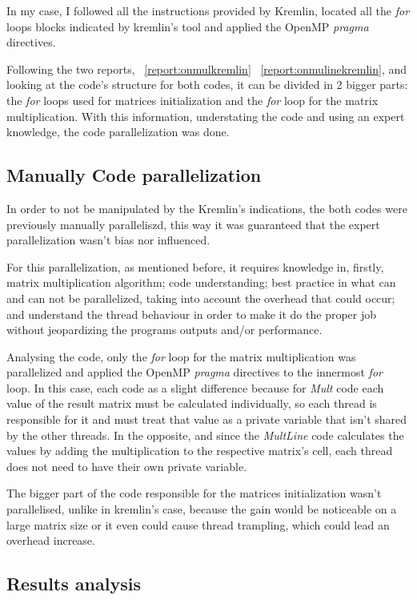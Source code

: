 In my case, I followed all the instructions provided by Kremlin, located all the \textit{for} loops blocks indicated by kremlin's tool and applied the OpenMP \textit{pragma} directives. 

Following the two reports, ~\ref{report:onmulkremlin} ~\ref{report:onmulinekremlin}, and looking at the code's structure for both codes, it can be divided in 2 bigger parts: the \textit{for} loops used for matrices initialization and the \textit{for} loop for the matrix multiplication. With this information, understating the code and using an expert knowledge, the code parallelization was done.


\subsection{Manually Code parallelization}

In order to not be manipulated by the Kremlin's indications, the both codes were previously manually paralleliszd, this way it was guaranteed that the expert parallelization wasn't bias nor influenced.

For this parallelization, as mentioned before, it requires knowledge in, firstly, matrix multiplication algorithm; code understanding; best practice in what can and can not be parallelized, taking into account the overhead that could occur; and understand the thread behaviour in order to make it do the proper job without jeopardizing the programs outputs and/or performance.  

Analysing the code, only the \textit{for} loop for the matrix multiplication was parallelized and applied the OpenMP \textit{pragma} directives to the innermost \textit{for} loop. In this case, each code as a slight difference because for \textit{Mult} code each value of the result matrix must be calculated individually, so each thread is responsible for it and must treat that value as a private variable that isn't shared by the other threads. In the opposite, and since the \textit{MultLine} code calculates the values by adding the multiplication to the respective matrix's cell, each thread does not need to have their own private variable.

The bigger part of the code responsible for the matrices initialization wasn't parallelised, unlike in kremlin's case, because the gain would be noticeable on a large matrix size or it even could cause thread trampling, which could lead an overhead increase. 


\subsection{Results analysis}

